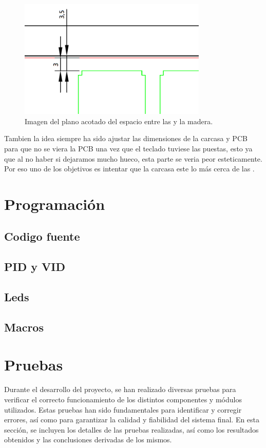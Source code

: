 \begin{figure}[H]
    \centering
    \includegraphics[width=0.8\textwidth]{imagenes/Capitulos/Cap05/AcotadoPCBMadera.png}
    \caption{Imagen del plano acotado del espacio entre las  y la madera.}
    \label{fig:PlanoSeparacionMadera}
\end{figure}

Tambien la idea siempre ha sido ajustar las dimensiones de la carcasa y \gls{PCB} para que no se viera la \gls{PCB} una vez que el teclado tuviese las  puestas, esto ya que al no haber  si dejaramos mucho hueco, esta parte se veria peor esteticamente. Por eso uno de los objetivos es intentar que la carcasa este lo más cerca de las .
\newpage

\section{Programación}
\subsection{Codigo fuente}\label{ApendiceCodigoFuente}
\subsection{PID y VID}\label{ApendicePIDVID}
\subsection{Leds}\label{ApendiceLeds}
\subsection{Macros}\label{ApendiceMacros}

\section{Pruebas}\label{ApendicePruebas}
Durante el desarrollo del proyecto, se han realizado diversas pruebas para verificar el correcto funcionamiento de los distintos componentes y módulos utilizados. Estas pruebas han sido fundamentales para identificar y corregir errores, así como para garantizar la calidad y fiabilidad del sistema final. En esta sección, se incluyen los detalles de las pruebas realizadas, así como los resultados obtenidos y las conclusiones derivadas de los mismos.

